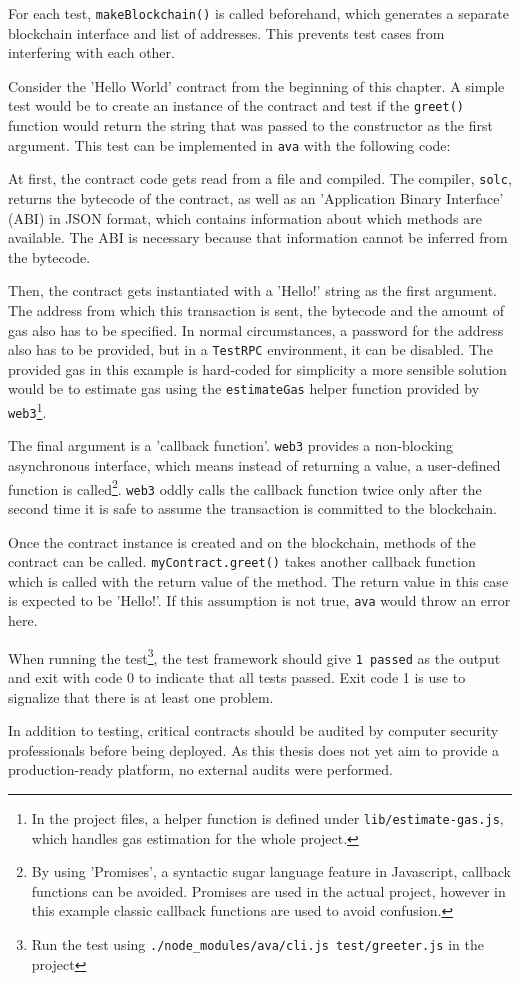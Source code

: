 For each test, \texttt{makeBlockchain()} is called beforehand, which generates a separate blockchain interface and list of addresses. This prevents test cases from interfering with each other.

Consider the 'Hello World' contract from the beginning of this chapter. A simple test would be to create an instance of the contract and test if the \texttt{greet()} function would return the string that was passed to the constructor as the first argument. This test can be implemented in \texttt{ava} with the following code:



At first, the contract code gets read from a file and compiled. The compiler, \texttt{solc}, returns the bytecode of the contract, as well as an 'Application Binary Interface' (ABI) in JSON format, which contains information about which methods are available. The ABI is necessary because that information cannot be inferred from the bytecode.

Then, the contract gets instantiated with a 'Hello!' string as the first argument. The address from which this transaction is sent, the bytecode and the amount of gas also has to be specified.
In normal circumstances, a password for the address also has to be provided, but in a \texttt{TestRPC} environment, it can be disabled.
The provided gas in this example is hard-coded for simplicity \textendash{} a more sensible solution would be to estimate gas using the \texttt{estimateGas} helper function provided by \texttt{web3}\footnote{In the project files, a helper function is defined under \texttt{lib/estimate-gas.js}, which handles gas estimation for the whole project.}.

The final argument is a 'callback function'. \texttt{web3} provides a non-blocking asynchronous interface, which means instead of returning a value, a user-defined function is called\footnote{By using 'Promises', a syntactic sugar language feature in Javascript, callback functions can be avoided. Promises are used in  the actual project, however in this example classic callback functions are used to avoid confusion.}.
\texttt{web3} oddly calls the callback function twice \textendash{} only after the second time it is safe to assume the transaction is committed to the blockchain.

Once the contract instance is created and on the blockchain, methods of the contract can be called. \texttt{myContract.greet()} takes another callback function which is called with the return value of the method. The return value in this case is expected to be 'Hello!'. If this assumption is not true, \texttt{ava} would throw an error here.

When running the test\footnote{Run the test using \texttt{./node\_modules/ava/cli.js test/greeter.js} in the project}, the test framework should give \texttt{1 passed} as the output and exit with code 0 to indicate that all tests passed. Exit code 1 is use to signalize that there is at least one problem.

In addition to testing, critical contracts should be audited by computer security professionals before being deployed. As this thesis does not yet aim to provide a production-ready platform, no external audits were performed.
